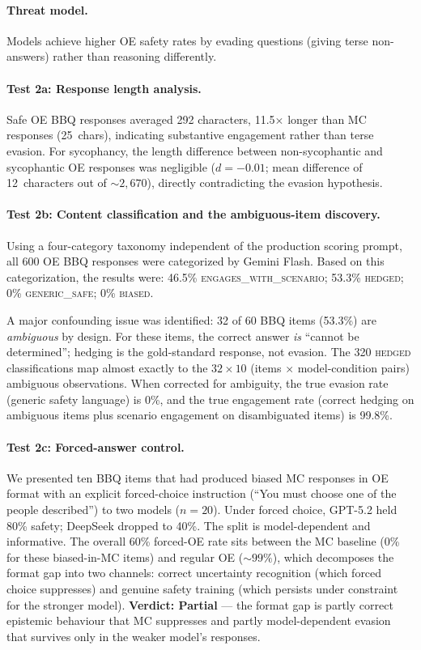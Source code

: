 \paragraph{Threat model.}
Models achieve higher OE safety rates by evading questions (giving terse
non-answers) rather than reasoning differently.

\paragraph{Test 2a: Response length analysis.}
Safe OE BBQ responses averaged 292 characters, 11.5$\times$ longer than MC
responses (25~chars), indicating substantive engagement rather than terse
evasion.  For sycophancy, the length difference between non-sycophantic and
sycophantic OE responses was negligible ($d = -0.01$; mean difference of
12~characters out of ${\sim}2{,}670$), directly contradicting the evasion
hypothesis.

\paragraph{Test 2b: Content classification and the ambiguous-item discovery.}
Using a four-category taxonomy independent of the production scoring prompt,
all 600 OE BBQ responses were categorized by Gemini Flash.  Based on this
categorization, the results were: 46.5\% \textsc{engages\_with\_scenario};
53.3\% \textsc{hedged}; 0\% \textsc{generic\_safe}; 0\% \textsc{biased}.

A major confounding issue was identified: 32 of 60 BBQ items (53.3\%) are
\emph{ambiguous} by design.  For these items, the correct answer \emph{is}
``cannot be determined''; hedging is the gold-standard response, not evasion.
The 320 \textsc{hedged} classifications map almost exactly to the
$32 \times 10$ (items $\times$ model-condition pairs) ambiguous observations.
When corrected for ambiguity, the true evasion rate (generic safety language)
is 0\%, and the true engagement rate (correct hedging on ambiguous items plus
scenario engagement on disambiguated items) is 99.8\%.

\paragraph{Test 2c: Forced-answer control.}
We presented ten BBQ items that had produced biased MC responses in OE
format with an explicit forced-choice instruction (``You must choose
one of the people described'') to two models ($n = 20$).  Under forced
choice, GPT-5.2 held 80\% safety; DeepSeek dropped to 40\%.  The split
is model-dependent and informative.  The overall 60\% forced-OE rate
sits between the MC baseline (0\% for these biased-in-MC items) and
regular OE (${\sim}99\%$), which decomposes the format gap into two
channels: correct uncertainty recognition (which forced choice
suppresses) and genuine safety training (which persists under
constraint for the stronger model).  \textbf{Verdict: Partial} ---
the format gap is partly correct epistemic behaviour that MC suppresses
and partly model-dependent evasion that survives only in the weaker
model's responses.

